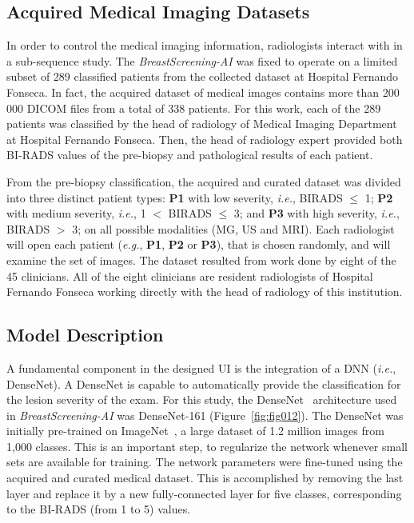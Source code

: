 \subsection{Acquired Medical Imaging Datasets}
\label{sec:sec006004004}

In order to control the medical imaging information, radiologists interact with in a sub-sequence study.
The {\it BreastScreening-AI} was fixed to operate on a limited subset of 289 classified patients from the collected dataset at Hospital Fernando Fonseca.
In fact, the acquired dataset of medical images contains more than 200 000 \ac{DICOM} files from a total of 338 patients.
For this work, each of the 289 patients was classified by the head of radiology of Medical Imaging Department at Hospital Fernando Fonseca.
Then, the head of radiology expert provided both \ac{BI-RADS} values of the pre-biopsy and pathological results of each patient.

From the pre-biopsy classification, the acquired and curated dataset was divided into three distinct patient types:
{\bf P1} with low severity, {\it i.e.}, BIRADS $\leq$ 1;
{\bf P2} with medium severity, {\it i.e.}, 1 $<$ BIRADS $\leq$ 3; and
{\bf P3} with high severity, {\it i.e.}, BIRADS $>$ 3;
on all possible modalities (\ac{MG}, \ac{US} and \ac{MRI}).
Each radiologist will open each patient ({\it e.g.}, {\bf P1}, {\bf P2} or {\bf P3}), that is chosen randomly, and will examine the set of images.
The dataset resulted from work done by eight of the 45 clinicians.
All of the eight clinicians are resident radiologists of Hospital Fernando Fonseca working directly with the head of radiology of this institution.

\subsection{Model Description}

A fundamental component in the designed \ac{UI} is the integration of a \ac{DNN} ({\it i.e.}, DenseNet).
A DenseNet is capable to automatically provide the classification for the lesion severity of the exam.
For this study, the DenseNet~\cite{Huang_2017_CVPR} architecture used in {\it BreastScreening-AI} was DenseNet-161 (Figure~\ref{fig:fig012}).
The DenseNet was initially pre-trained on ImageNet~\cite{10.1145/3351095.3375709}, a large dataset of 1.2 million images from 1,000 classes.
This is an important step, to regularize the network whenever small sets are available for training.
The network parameters were fine-tuned using the acquired and curated medical dataset.
This is accomplished by removing the last layer and replace it by a new fully-connected layer for five classes, corresponding to the \ac{BI-RADS} (from 1 to 5) values.

